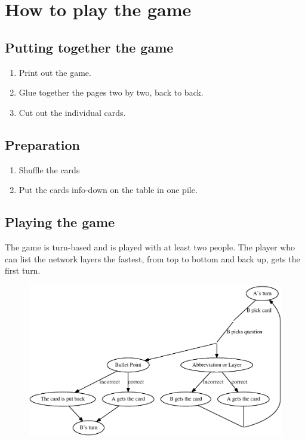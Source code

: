 \documentclass[main.tex]{subfiles}
\begin{document}
\section*{How to play the game}


\subsection*{Putting together the game}
\begin{enumerate}
\item Print out the game.
\item Glue together the pages two by two, back to back.
\item Cut out the individual cards.
\end{enumerate}

\subsection*{Preparation}
\begin{enumerate}
\item Shuffle the cards
\item Put the cards info-down on the table in one pile.
\end{enumerate}

\subsection*{Playing the game}
The game is turn-based and is played with at least two people.
The player who can list the network layers the fastest, from top to bottom and back up, gets the first turn.

\begin{figure}[H]
    \includegraphics[width=\textwidth]{rules.eps}
\end{figure}
\end{document}
